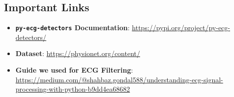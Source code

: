 \subsection{Important Links}\label{sec:ecg:links}
\begin{itemize}
    \item \textbf{\texttt{py-ecg-detectors} Documentation}: \href{https://pypi.org/project/py-ecg-detectors/}{https://pypi.org/project/py-ecg-detectors/}
    \item \textbf{Dataset}: \href{https://physionet.org/content/}{https://physionet.org/content/}
    \item \textbf{Guide we used for ECG Filtering}: \href{https://medium.com/@shahbaz.gondal588/understanding-ecg-signal-processing-with-python-b9dd4ea68682}{https://medium.com/@shahbaz.gondal588/understanding-ecg-signal-processing-with-python-b9dd4ea68682}
\end{itemize}
